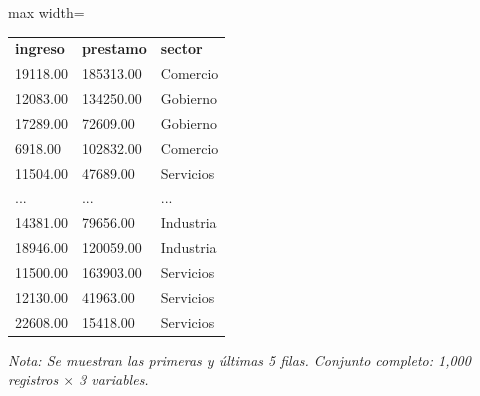 

\begin{table}[htbp]

\centering

\begin{adjustbox}{max width=\textwidth}

\begin{tabular}{lll}

\rowcolor{ThemeBackground}
\rule{0pt}{0.45cm}
\textcolor{ThemeGold}{\bfseries ingreso} & \textcolor{ThemeGold}{\bfseries prestamo} & \textcolor{ThemeGold}{\bfseries sector} \\

19118.00 & 185313.00 & Comercio \\
12083.00 & 134250.00 & Gobierno \\
17289.00 & 72609.00 & Gobierno \\
6918.00 & 102832.00 & Comercio \\
11504.00 & 47689.00 & Servicios \\
... & ... & ... \\
14381.00 & 79656.00 & Industria \\
18946.00 & 120059.00 & Industria \\
11500.00 & 163903.00 & Servicios \\
12130.00 & 41963.00 & Servicios \\
22608.00 & 15418.00 & Servicios \\
\bottomrule
\end{tabular}

\end{adjustbox}

\vspace{0.15cm}
{\raggedright\sffamily\footnotesize\color{ThemeMuted}
\textit{Nota: Se muestran las primeras y últimas 5 filas. Conjunto completo: 1,000 registros $\times$ 3 variables.}}

\end{table}

